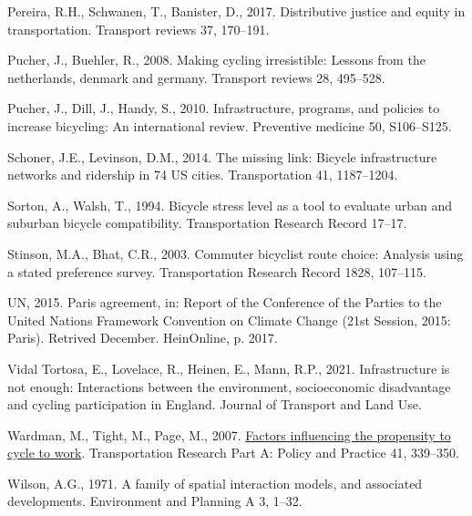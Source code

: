 \documentclass[
]{article}
\newlength{\cslhangindent}
\newlength{\cslentryspacingunit} %
\newenvironment{CSLReferences}[2] %
 {%
  \setlength{\parindent}{0pt}
  \ifodd #1
  \let\oldpar\par
  \def\par{\hangindent=\cslhangindent\oldpar}
  \fi
  \setlength{\parskip}{#2\cslentryspacingunit}
 }%
 {}
\begin{document}
\begin{CSLReferences}{1}{0}
\leavevmode{}%
Pereira, R.H., Schwanen, T., Banister, D., 2017. Distributive justice and equity in transportation. Transport reviews 37, 170--191.

\leavevmode{}%
Pucher, J., Buehler, R., 2008. Making cycling irresistible: Lessons from the netherlands, denmark and germany. Transport reviews 28, 495--528.

\leavevmode{}%
Pucher, J., Dill, J., Handy, S., 2010. Infrastructure, programs, and policies to increase bicycling: An international review. Preventive medicine 50, S106--S125.

\leavevmode{}%
Schoner, J.E., Levinson, D.M., 2014. The missing link: Bicycle infrastructure networks and ridership in 74 US cities. Transportation 41, 1187--1204.

\leavevmode{}%
Sorton, A., Walsh, T., 1994. Bicycle stress level as a tool to evaluate urban and suburban bicycle compatibility. Transportation Research Record 17--17.

\leavevmode{}%
Stinson, M.A., Bhat, C.R., 2003. Commuter bicyclist route choice: Analysis using a stated preference survey. Transportation Research Record 1828, 107--115.

\leavevmode{}%
UN, 2015. Paris agreement, in: Report of the Conference of the Parties to the United Nations Framework Convention on Climate Change (21st Session, 2015: Paris). Retrived December. HeinOnline, p. 2017.

\leavevmode{}%
Vidal Tortosa, E., Lovelace, R., Heinen, E., Mann, R.P., 2021. Infrastructure is not enough: Interactions between the environment, socioeconomic disadvantage and cycling participation in {England}. Journal of Transport and Land Use.

\leavevmode{}%
Wardman, M., Tight, M., Page, M., 2007. \href{https://doi.org/10.1016/j.tra.2006.09.011}{Factors influencing the propensity to cycle to work}. Transportation Research Part A: Policy and Practice 41, 339--350.

\leavevmode{}%
Wilson, A.G., 1971. A family of spatial interaction models, and associated developments. Environment and Planning A 3, 1--32.


\end{CSLReferences}
\end{document}
